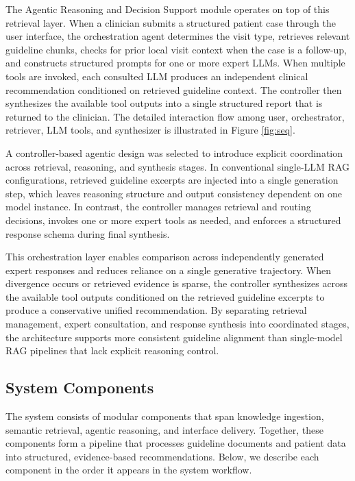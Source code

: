 \documentclass[preprint,12pt]{elsarticle}
\begin{document}
The Agentic Reasoning and Decision Support module operates on top of this retrieval layer. When a clinician submits a structured patient case through the user interface, the orchestration agent determines the visit type, retrieves relevant guideline chunks, checks for prior local visit context when the case is a follow-up, and constructs structured prompts for one or more expert LLMs. When multiple tools are invoked, each consulted LLM produces an independent clinical recommendation conditioned on retrieved guideline context. The controller then synthesizes the available tool outputs into a single structured report that is returned to the clinician. The detailed interaction flow among user, orchestrator, retriever, LLM tools, and synthesizer is illustrated in Figure \ref{fig:seq}.

A controller-based agentic design was selected to introduce explicit coordination across retrieval, reasoning, and synthesis stages. In conventional single-LLM RAG configurations, retrieved guideline excerpts are injected into a single generation step, which leaves reasoning structure and output consistency dependent on one model instance. In contrast, the controller manages retrieval and routing decisions, invokes one or more expert tools as needed, and enforces a structured response schema during final synthesis.

This orchestration layer enables comparison across independently generated expert responses and reduces reliance on a single generative trajectory. When divergence occurs or retrieved evidence is sparse, the controller synthesizes across the available tool outputs conditioned on the retrieved guideline excerpts to produce a conservative unified recommendation. By separating retrieval management, expert consultation, and response synthesis into coordinated stages, the architecture supports more consistent guideline alignment than single-model RAG pipelines that lack explicit reasoning control.




\subsection{System Components}

The system consists of modular components that span knowledge ingestion, semantic retrieval, agentic reasoning, and interface delivery. Together, these components form a pipeline that processes guideline documents and patient data into structured, evidence-based recommendations. Below, we describe each component in the order it appears in the system workflow.
\end{document}
